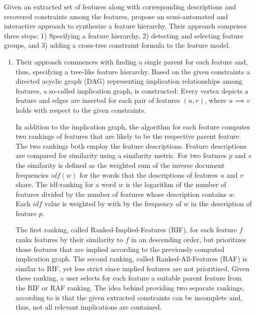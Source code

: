 Given an extracted set of features along with corresponding descriptions and
recovered constraints among the features, \cite{she_reverse_2011} propose an
semi-automated and interactive approach to synthesize a feature hierarchy.
Their approach comprises three steps: 1) Specifying a feature hierarchy, 2)
detecting and selecting feature groups, and 3) adding a cross-tree constraint
formula to the feature  model.

\begin{enumerate}
  \item Their approach commences with finding a single parent for each
  feature and, thus, specifying a tree-like feature hierarchy. Based on the
  given constraints a directed acyclic graph (DAG) representing implication
  relationships among features, a so-called implication graph, is constructed:
  Every vertex depicts a feature and edges are inserted for each pair of
  features $(u, v)$, where  $u \implies v$ holds with respect to the given
  constraints.
   
  In addition to the implication graph, the algorithm for each feature computes
  two rankings of features that are likely to be the respective parent feature.
  The two rankings both employ the feature descriptions. Feature descriptions
  are compared for similarity using a similarity metric. For two features $p$
  and $s$ the similarity is defined as the weighted sum of the inverse document
  frequencies $idf(w)$ for the words that the descriptions of features $u$ and
  $v$ share.
  The idf-ranking for a word $w$ is the logarithm of the number of features
  divided by the number of features whose description contains $w$. Each $idf$
  value is weighted by with by the frequency of $w$ in the description of
  feature $p$.
  
  The first ranking, called Ranked-Implied-Features (RIF), for each feature $f$
  ranks features by their similarity to $f$ in an descending order, but
  prioritizes those features that are implied according to the previously
  computed implication graph. The second ranking, called Ranked-All-Features
  (RAF) is similar to RIF, yet less strict since implied features are not
  prioritized. Given these ranking, a user selects for each feature a suitable
  parent feature from the RIF or RAF ranking. The idea behind providing two
  separate rankings, according to \cite{she_reverse_2011} is that the given
  extracted constraints can be incomplete and, thus, not all relevant implications are
  contained.


\end{enumerate}
